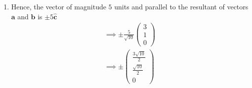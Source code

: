 \documentclass[12pt]{article}
\newcommand{\myvec}[1]{\ensuremath{\begin{pmatrix}#1\end{pmatrix}}}
\let\vec\mathbf
\begin{document}
\begin{enumerate}
\begin{align}
\[ \[ \vec{\hat{c}}=\frac{\myvec{3\\1\\0}}{\sqrt{3^2 + 1^2}}\]
 \[ \vec{\hat{c}}=\frac{\myvec{3\\1\\0}}{\sqrt{10}}\]
\end{align}
 \item Hence, the vector of magnitude $5$ units and parallel to the resultant of vectors $\vec{a}$ and $\vec{b}$ is $\pm 5\vec{\hat{c}}$\\
 \begin{align}
  \implies \pm \frac{5}{\sqrt{10}} \myvec{3\\1\\0}\\
  \implies \pm \myvec{{\frac{3\sqrt{10}}{2}}\\{\frac{\sqrt{10}}{2}}\\{0}}
 \end{align}
\end{enumerate} 
\end{document}
